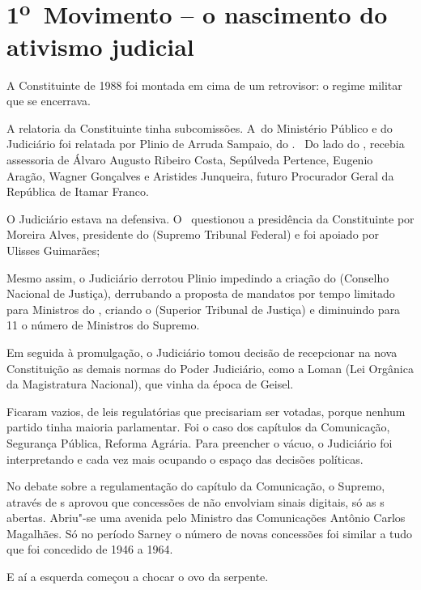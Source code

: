  

\section{1\textsuperscript{o}~Movimento -- o nascimento do ativismo
judicial}

A Constituinte de 1988 foi montada em cima de um retrovisor: o regime
militar que se encerrava.

A relatoria da Constituinte tinha subcomissões. A~do Ministério Público
e do Judiciário foi relatada por Plinio de Arruda Sampaio, do .~ Do
lado do , recebia assessoria de Álvaro Augusto Ribeiro Costa,
Sepúlveda Pertence, Eugenio Aragão, Wagner Gonçalves e Aristides
Junqueira, futuro Procurador Geral da República de Itamar Franco.

O Judiciário estava na defensiva. O~ questionou a presidência da
Constituinte por Moreira Alves, presidente do  (Supremo Tribunal
Federal) e foi apoiado por Ulisses Guimarães;

Mesmo assim, o Judiciário derrotou Plinio impedindo a criação do 
(Conselho Nacional de Justiça), derrubando a proposta de mandatos por
tempo limitado para Ministros do , criando o  (Superior Tribunal
de Justiça) e diminuindo para 11 o número de Ministros do Supremo.

Em seguida à promulgação, o Judiciário tomou decisão de recepcionar na
nova Constituição as demais normas do Poder Judiciário, como a Loman
(Lei Orgânica da Magistratura Nacional), que vinha da época de Geisel.

Ficaram vazios, de leis regulatórias que precisariam ser votadas, porque
nenhum partido tinha maioria parlamentar. Foi o caso dos capítulos da
Comunicação, Segurança Pública, Reforma Agrária. Para preencher o vácuo,
o Judiciário foi interpretando e cada vez mais ocupando o espaço das
decisões políticas.

No debate sobre a regulamentação do capítulo da Comunicação, o Supremo,
através de s aprovou que concessões de  não envolviam sinais
digitais, só as s abertas. Abriu"-se uma avenida pelo Ministro das
Comunicações Antônio Carlos Magalhães. Só no período Sarney o número de
novas concessões foi similar a tudo que foi concedido de 1946 a 1964.

E aí a esquerda começou a chocar o ovo da serpente.

